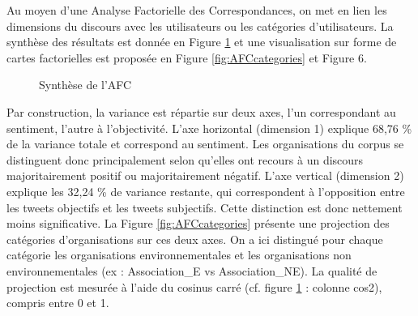             Au moyen d’une Analyse Factorielle des Correspondances, on met en lien les dimensions du discours avec les utilisateurs ou les catégories d’utilisateurs. La synthèse des résultats est donnée en Figure \ref{fig:syntheseAFC} et une visualisation sur forme de cartes factorielles est proposée en Figure \ref{fig:AFCcategories} et Figure 6.

            \begin{figure}
                \caption{Synthèse de l'AFC}
                \label{fig:syntheseAFC}
            \end{figure}

            Par construction, la variance est répartie sur deux axes, l’un correspondant au sentiment, l’autre à l’objectivité. L’axe horizontal (dimension 1) explique 68,76 \% de la variance totale et correspond au sentiment. Les organisations du corpus se distinguent donc principalement selon qu’elles ont recours à un discours majoritairement positif ou majoritairement négatif. L’axe vertical (dimension 2) explique les 32,24 \% de variance restante, qui correspondent à l’opposition entre les tweets objectifs et les tweets subjectifs. Cette distinction est donc nettement moins significative. La Figure \ref{fig:AFCcategories} présente une projection des catégories d’organisations sur ces deux axes. On a ici distingué pour chaque catégorie les organisations environnementales et les organisations non environnementales (ex : Association\_E vs Association\_NE). La qualité de projection est mesurée à l’aide du cosinus carré (cf. figure \ref{fig:syntheseAFC} : colonne cos2), compris entre 0 et 1.

